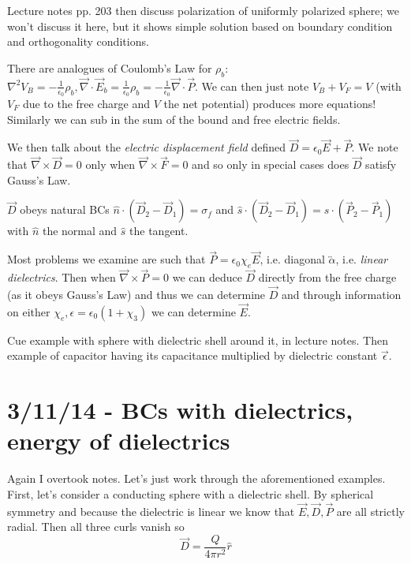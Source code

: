 \documentclass[10pt]{report}
\newcommand{\tensor}[1]{\overleftrightarrow{#1}}
\begin{document}
Lecture notes pp. 203 then discuss polarization of uniformly polarized sphere; we won't discuss it here, but it shows simple solution based on boundary condition and orthogonality conditions. 

There are analogues of Coulomb's Law for $\rho_b$: $\nabla ^2 V_B = -\frac{1}{\epsilon_0}\rho_b, \vec{\nabla }\cdot \vec{E}_b = \frac{1}{\epsilon_0}\rho_b = -\frac{1}{\epsilon_0}\vec{\nabla}\cdot \vec{P}$. We can then just note $V_B + V_F = V$ (with $V_F$ due to the free charge and $V$ the net potential) produces more equations! Similarly we can sub in the sum of the bound and free electric fields.

We then talk about the \emph{electric displacement field} defined $\vec{D} = \epsilon_0\vec{E} + \vec{P}$. We note that $\vec{\nabla }\times \vec{D} = 0$ only when $\vec{\nabla }\times\vec{F} = 0$ and so only in special cases does $\vec{D}$ satisfy Gauss's Law. 

$\vec{D}$ obeys natural BCs $\hat{n}\cdot \left( \vec{D}_2  - \vec{D}_1 \right) = \sigma_f$ and $\hat{s} \cdot \left( \vec{D}_2 - \vec{D}_1 \right) = \hat{s}\cdot\left( \vec{P}_2 - \vec{P}_1 \right)$ with $\hat{n}$ the normal and $\hat{s}$ the tangent.

Most problems we examine are such that $\vec{P} = \epsilon_0 \chi_e\vec{E}$, i.e. diagonal $\tensor{\alpha}$, i.e. \emph{linear dielectrics}. Then when $\vec{\nabla }\times\vec{P} = 0$ we can deduce $\vec{D}$ directly from the free charge (as it obeys Gauss's Law) and thus we can determine $\vec{D}$ and through information on either $\chi_e, \epsilon = \epsilon_0(1 + \chi_3)$ we can determine $\vec{E}$.

Cue example with sphere with dielectric shell around it, in lecture notes. Then example of capacitor having its capacitance multiplied by dielectric constant $\vec{\epsilon}$. 

\chapter{3/11/14 - BCs with dielectrics, energy of dielectrics}

Again I overtook notes. Let's just work through the aforementioned examples. First, let's consider a conducting sphere with a dielectric shell. By spherical symmetry and because the dielectric is linear we know that $\vec{E}, \vec{D}, \vec{P}$ are all strictly radial. Then all three curls vanish so
\begin{equation}
    \vec{D} = \frac{Q}{4\pi r^2}\hat{r}
\end{equation}
\end{document}

